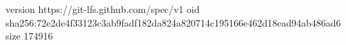 version https://git-lfs.github.com/spec/v1
oid sha256:72e2de4f33123c3ab9fadf182da824a820714c195166e462d18ead94ab486ad6
size 174916
